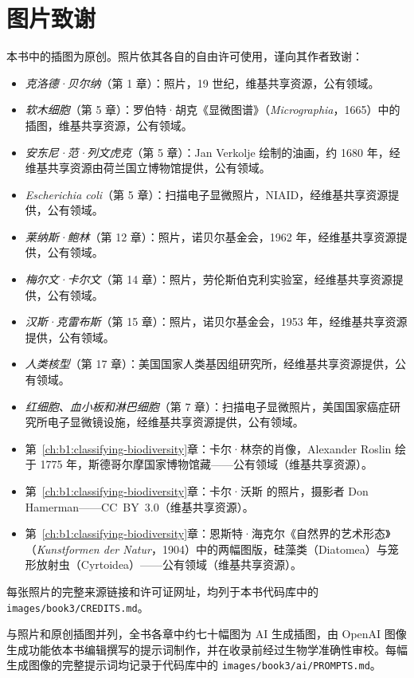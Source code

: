 \chapter*{图片致谢}

本书中的插图为原创。照片依其各自的自由许可使用，谨向其作者致谢：

\begin{itemize}
  \item \emph{克洛德·贝尔纳}（第 1 章）：照片，19 世纪，维基共享资源，公有领域。
  \item \emph{软木细胞}（第 5 章）：罗伯特·胡克《显微图谱》（\emph{Micrographia}，1665）中的插图，维基共享资源，公有领域。
  \item \emph{安东尼·范·列文虎克}（第 5 章）：Jan Verkolje 绘制的油画，约 1680 年，经维基共享资源由荷兰国立博物馆提供，公有领域。
  \item \emph{Escherichia coli}（第 5 章）：扫描电子显微照片，NIAID，经维基共享资源提供，公有领域。
  \item \emph{莱纳斯·鲍林}（第 12 章）：照片，诺贝尔基金会，1962 年，经维基共享资源提供，公有领域。
  \item \emph{梅尔文·卡尔文}（第 14 章）：照片，劳伦斯伯克利实验室，经维基共享资源提供，公有领域。
  \item \emph{汉斯·克雷布斯}（第 15 章）：照片，诺贝尔基金会，1953 年，经维基共享资源提供，公有领域。
  \item \emph{人类核型}（第 17 章）：美国国家人类基因组研究所，经维基共享资源提供，公有领域。
  \item \emph{红细胞、血小板和淋巴细胞}（第 7 章）：扫描电子显微照片，美国国家癌症研究所电子显微镜设施，经维基共享资源提供，公有领域。
  \item 第~\ref{ch:b1:classifying-biodiversity}章：卡尔·林奈的肖像，Alexander Roslin 绘于 1775 年，斯德哥尔摩国家博物馆藏——公有领域（维基共享资源）。
  \item 第~\ref{ch:b1:classifying-biodiversity}章：卡尔·沃斯 的照片，摄影者 Don Hamerman——CC~BY~3.0（维基共享资源）。
  \item 第~\ref{ch:b1:classifying-biodiversity}章：恩斯特·海克尔《自然界的艺术形态》（\emph{Kunstformen der Natur}，1904）中的两幅图版，硅藻类（Diatomea）与笼形放射虫（Cyrtoidea）——公有领域（维基共享资源）。
\end{itemize}

每张照片的完整来源链接和许可证网址，均列于本书代码库中的 \texttt{images/book3/CREDITS.md}。

\bigskip
与照片和原创插图并列，全书各章中约七十幅图为 AI 生成插图，由 OpenAI 图像生成功能依本书编辑撰写的提示词制作，并在收录前经过生物学准确性审校。每幅生成图像的完整提示词均记录于代码库中的 \texttt{images/book3/ai/PROMPTS.md}。
\clearpage
